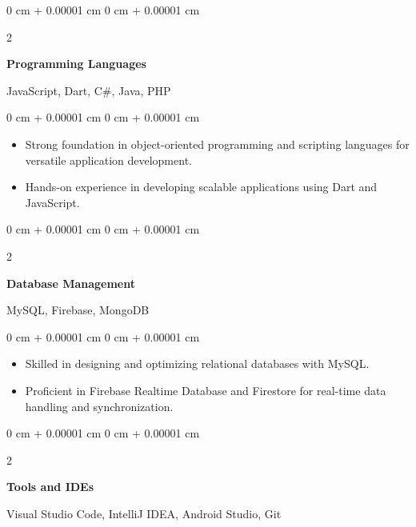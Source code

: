 \documentclass[10pt, letterpaper]{article}
\newenvironment{highlights}{
    \begin{itemize}[
        topsep=0.10 cm,
        parsep=0.10 cm,
        partopsep=0pt,
        itemsep=0pt,
        leftmargin=0 cm + 10pt
    ]
}{
    \end{itemize}
} %
\newenvironment{onecolentry}{
    \begin{adjustwidth}{
        0 cm + 0.00001 cm
    }{
        0 cm + 0.00001 cm
    }
}{
    \end{adjustwidth}
} %
\newenvironment{twocolentry}[2][]{
    \onecolentry
    \def\secondColumn{#2}
    \setcolumnwidth{\fill, 4.5 cm}
    \begin{paracol}{2}
}{
    \switchcolumn \raggedleft \secondColumn
    \end{paracol}
    \endonecolentry
} %
\begin{document}
                \vspace{0.2 cm}
                
                \begin{twocolentry}{
                    JavaScript, Dart, C\#, Java, PHP
                }
                    \textbf{Programming Languages}
                \end{twocolentry}
                
                \vspace{0.10 cm}
                \begin{onecolentry}
                    \begin{highlights}
                        \item Strong foundation in object-oriented programming and scripting languages for versatile application development.
                        \item Hands-on experience in developing scalable applications using Dart and JavaScript.
                    \end{highlights}
                \end{onecolentry}
                
                \vspace{0.2 cm}
                
                \begin{twocolentry}{
                    MySQL, Firebase, MongoDB
                }
                    \textbf{Database Management}
                \end{twocolentry}
                
                \vspace{0.10 cm}
                \begin{onecolentry}
                    \begin{highlights}
                        \item Skilled in designing and optimizing relational databases with MySQL.
                        \item Proficient in Firebase Realtime Database and Firestore for real-time data handling and synchronization.
                    \end{highlights}
                \end{onecolentry}
                
                \vspace{0.2 cm}
                
                \begin{twocolentry}{
                    Visual Studio Code, IntelliJ IDEA, Android Studio, Git
                }
                    \textbf{Tools and IDEs}
                \end{twocolentry}
                
\end{document}
